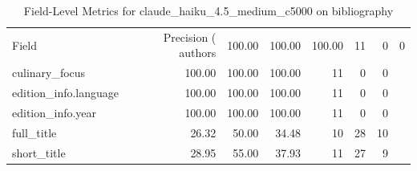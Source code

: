 \begin{table}
\caption{Field-Level Metrics for claude_haiku_4.5_medium_c5000 on bibliography}
\label{tab:fields_claude_haiku_4.5_medium_c5000_bibliography}
\begin{tabular}{lrrrrrr}
\toprule
Field & Precision (%
\midrule
authors & 100.00 & 100.00 & 100.00 & 11 & 0 & 0 \\
culinary_focus & 100.00 & 100.00 & 100.00 & 11 & 0 & 0 \\
edition_info.language & 100.00 & 100.00 & 100.00 & 11 & 0 & 0 \\
edition_info.year & 100.00 & 100.00 & 100.00 & 11 & 0 & 0 \\
full_title & 26.32 & 50.00 & 34.48 & 10 & 28 & 10 \\
short_title & 28.95 & 55.00 & 37.93 & 11 & 27 & 9 \\
\bottomrule
\end{tabular}
\end{table}
